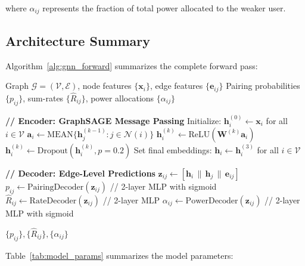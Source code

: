 where $\alpha_{ij}$ represents the fraction of total power allocated to the weaker user.

\subsection{Architecture Summary}

Algorithm~\ref{alg:gnn_forward} summarizes the complete forward pass:

\begin{algorithm}[H]
\caption{NOMA-GNN Forward Pass}
\label{alg:gnn_forward}
\begin{algorithmic}[1]
\Require Graph $\mathcal{G} = (\mathcal{V}, \mathcal{E})$, node features $\{\mathbf{x}_i\}$, edge features $\{\mathbf{e}_{ij}\}$
\Ensure Pairing probabilities $\{p_{ij}\}$, sum-rates $\{\hat{R}_{ij}\}$, power allocations $\{\alpha_{ij}\}$

\State \textbf{// Encoder: GraphSAGE Message Passing}
\State Initialize: $\mathbf{h}_i^{(0)} \leftarrow \mathbf{x}_i$ for all $i \in \mathcal{V}$
        \State $\mathbf{a}_i \leftarrow \text{MEAN}\{\mathbf{h}_j^{(k-1)} : j \in \mathcal{N}(i)\}$
        \State $\mathbf{h}_i^{(k)} \leftarrow \text{ReLU}(\mathbf{W}^{(k)} \mathbf{a}_i)$
        \State $\mathbf{h}_i^{(k)} \leftarrow \text{Dropout}(\mathbf{h}_i^{(k)}, p=0.2)$
    \EndFor
\EndFor
\State Set final embeddings: $\mathbf{h}_i \leftarrow \mathbf{h}_i^{(3)}$ for all $i \in \mathcal{V}$

\State \textbf{// Decoder: Edge-Level Predictions}
    \State $\mathbf{z}_{ij} \leftarrow [\mathbf{h}_i \,\|\, \mathbf{h}_j \,\|\, \mathbf{e}_{ij}]$
    \State $p_{ij} \leftarrow \text{PairingDecoder}(\mathbf{z}_{ij})$ \quad // 2-layer MLP with sigmoid
    \State $\hat{R}_{ij} \leftarrow \text{RateDecoder}(\mathbf{z}_{ij})$ \quad // 2-layer MLP
    \State $\alpha_{ij} \leftarrow \text{PowerDecoder}(\mathbf{z}_{ij})$ \quad // 2-layer MLP with sigmoid
\EndFor

\State \Return $\{p_{ij}\}, \{\hat{R}_{ij}\}, \{\alpha_{ij}\}$
\end{algorithmic}
\end{algorithm}

Table~\ref{tab:model_params} summarizes the model parameters:

